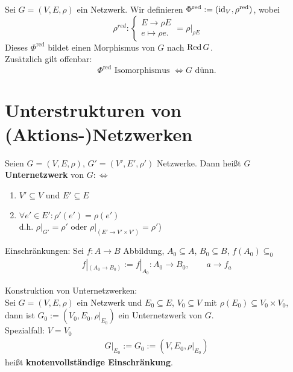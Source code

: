 \begin{bemerkungnr}\enter
    Sei $G = (V, E, \rho)$ ein Netzwerk.
    Wir definieren $ \Phi^{\text{red}} := (\operatorname{id}_V, \rho^{\text{red}})$, wobei
    $$ \rho^{red} : \begin{cases}
        E \to \rho E\\ 
        e\mapsto \rho e.\end{cases} = \rho|_{\rho E}$$
    Dieses $ \Phi^{\text{red}} $ bildet einen Morphismus von $G$ nach $\operatorname{Red} G$.\\
    Zusätzlich gilt offenbar:
    $$ \Phi^{\text{red}} \text{ Isomorphismus } \iff G \text{ dünn}.$$
\end{bemerkungnr}

\section{Unterstrukturen von (Aktions-)Netzwerken}
\begin{definition}
    Seien $G=(V,E,\rho)$, $G'=(V',E',\rho')$ Netzwerke. Dann heißt $G$ \textbf{Unternetzwerk} von $G:\Longleftrightarrow$
    \begin{enumerate}
        \item $V'\subseteq V$ und $E'\subseteq E$
        \item $\forall e'\in E':\rho'(e')=\rho(e')$\\
        d.h. $\rho|_{G'}=\rho'$ oder $\rho|_{(E'\to V'\times V')}=\rho'$)
    \end{enumerate}
\end{definition}

\begin{notation}
    Einschränkungen: Sei $f:A\to B$ Abbildung, $A_0\subseteq A$, $B_0\subseteq B$, $f(A_0)\subseteq_0$
    \begin{align*}
        f|_{(A_0\to B_0)}:=f|_{A_0}:A_0\to B_0,\qquad a\to f_a
    \end{align*}
\end{notation}

Konstruktion von Unternetzwerken:\\
Sei $G=(V,E,\rho)$ ein Netzwerk und $E_0\subseteq E$, $V_0\subseteq V$ mit $\rho(E_0)\subseteq V_0\times V_0$, dann ist $G_0:=(V_0,E_0,\rho|_{E_0})$ ein Unternetzwerk von $G$.\\
Spezialfall: $V=V_0$
\begin{align*}
    G|_{E_0}:=G_0:=(V,E_0,\rho|_{E_0})
\end{align*}
heißt \textbf{knotenvollständige Einschränkung}.

